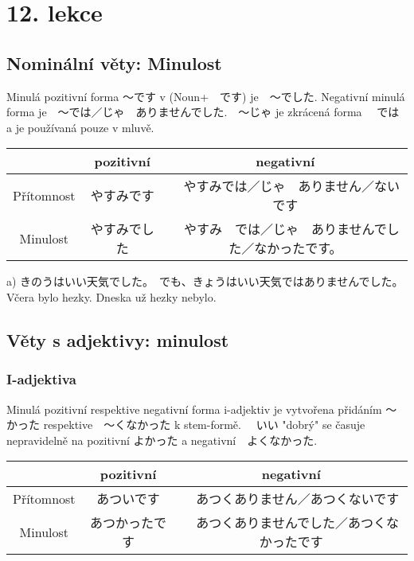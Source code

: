 \section{12. lekce}
\label{sec:lekce_12}

\subsection{Nominální věty: Minulost}
Minulá pozitivní forma 〜です v (Noun+　です) je　〜でした. Negativní minulá forma je　〜では／じゃ　ありませんでした.　〜じゃ je zkrácená forma 　では　a je používaná pouze v mluvě.

\begin{center}
\begin{tabular}{|c|c|c|}
\hline
&pozitivní & negativní\\
\hline
Přítomnost&やすみです&　やすみでは／じゃ　ありません／ないです\\
\hline
Minulost&やすみでした&　やすみ　では／じゃ　ありませんでした／なかったです。\\
\hline
\end{tabular}
\end{center}

a) きのうはいい天気でした。　でも、きょうはいい天気ではありませんでした。Včera bylo hezky. Dneska už hezky nebylo.

\subsection{Věty s adjektivy: minulost}
\subsubsection{I-adjektiva}
Minulá pozitivní respektive negativní forma i-adjektiv je vytvořena přidáním 〜かった respektive　〜くなかった k stem-formě. 　いい "dobrý" se časuje nepravidelně na  pozitivní よかった a negativní　よくなかった.

\begin{center}
\begin{tabular}{|c|c|c|}
\hline
&pozitivní & negativní\\
\hline
Přítomnost &あついです&　あつくありません／あつくないです\\
\hline
Minulost &あつかったです&　あつくありませんでした／あつくなかったです\\
\hline
\end{tabular}
\end{center}

